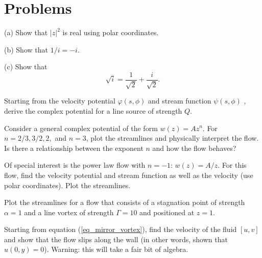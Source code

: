 \section*{Problems}
%

\begin{problem}

(a) Show that $|z|^2$ is real using polar coordinates.

(b) Show that $1/i = -i$.

(c) Show that
\[
\sqrt{i} = \frac{1}{\sqrt{2}} + \frac{i}{\sqrt{2}}.
\]
\end{problem}


\begin{problem}
\label{prob_line_source_w}
Starting from the velocity potential $\varphi(s, \phi)$ and stream function $\psi(s, \phi)$ , derive the complex potential for a line source of strength $Q$.
\end{problem}


\begin{problem}
Consider a general complex potential of the form $w(z) = Az^n$.  For $n = 2/3, 3/2, 2,$ and $n = 3$, plot the streamlines and physically interpret the flow.  Is there a relationship between the exponent $n$ and how the flow behaves?
\end{problem}

\begin{problem}
Of special interest is the power law flow with $n = -1$: $w(z) = A/z$.  For this flow, find the velocity potential and stream function as well as the velocity (use polar coordinates).  Plot the streamlines.
\end{problem}

\begin{problem}
Plot the streamlines for a flow that consists of a stagnation point of strength $\alpha = 1$ and a line vortex of strength $\Gamma = 10$ and positioned at $z = 1$.
\end{problem}

\begin{problem}
\label{prob_mirror_bc}
Starting from equation (\ref{eq_mirror_vortex}), find the velocity of the fluid $[u, v]$ and show that the flow slips along the wall (in other words, shown that $u(0, y) = 0$).  Warning:  this will take a fair bit of algebra.
\end{problem}

